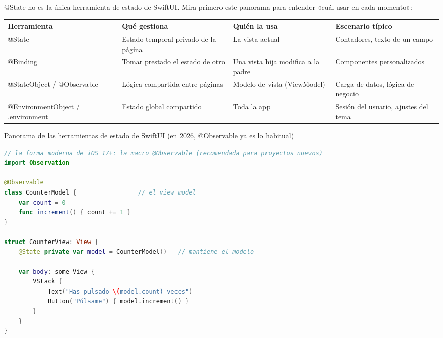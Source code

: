 


@State no es la única herramienta de estado de SwiftUI. Mira primero este panorama para entender «cuál usar en cada momento»:

\begin{center}
\begin{tabularx}{\linewidth}{|X|X|X|X|}
\hline
\textbf{Herramienta} & \textbf{Qué gestiona} & \textbf{Quién la usa} & \textbf{Escenario típico} \tabularnewline
\hline
@State & Estado temporal privado de la página & La vista actual & Contadores, texto de un campo \tabularnewline
@Binding & Tomar prestado el estado de otro & Una vista hija modifica a la padre & Componentes personalizados \tabularnewline
@StateObject / @Observable & Lógica compartida entre páginas & Modelo de vista (ViewModel) & Carga de datos, lógica de negocio \tabularnewline
@EnvironmentObject / .environment & Estado global compartido & Toda la app & Sesión del usuario, ajustes del tema \tabularnewline
\hline
\end{tabularx}
\end{center}

\begin{center}\small\color{gray}Panorama de las herramientas de estado de SwiftUI (en 2026, @Observable ya es lo habitual)\end{center}

\begin{lstlisting}[language=Swift]
// la forma moderna de iOS 17+: la macro @Observable (recomendada para proyectos nuevos)
import Observation

@Observable
class CounterModel {                 // el view model
    var count = 0
    func increment() { count += 1 }
}

struct CounterView: View {
    @State private var model = CounterModel()   // mantiene el modelo

    var body: some View {
        VStack {
            Text("Has pulsado \(model.count) veces")
            Button("Púlsame") { model.increment() }
        }
    }
}
\end{lstlisting}

